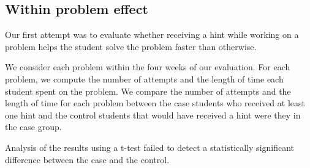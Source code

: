 \documentclass{llncs2e/llncs}
\begin{document}
\subsection{Within problem effect}

Our first attempt was to evaluate whether receiving a hint while working on a problem helps the student solve the problem faster than otherwise.

We consider each problem within the four weeks of our evaluation. For each problem, we compute the number of attempts and the length of time each student spent on the problem. We compare the number of attempts and the length of time for each problem between the case students who received at least one hint and the control students that would have received a hint were they in the case group.

Analysis of the results using a t-test failed to detect a statistically significant difference between the case and the control. 
\end{document}
